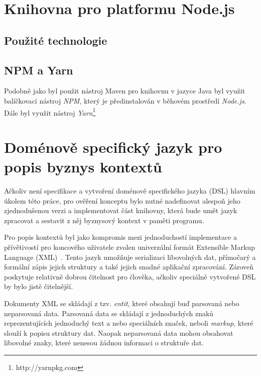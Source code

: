 \subsection{}

\section{Knihovna pro platformu Node.js}


\subsection{Použité technologie}

\subsection{NPM a Yarn}

Podobně jako byl použit nástroj Maven pro knihovnu v jazyce Java byl
využit balíčkovací nástroj \textit{NPM}, který je předinstalován
v běhovém prostředí \textit{Node.js}. Dále byl využit nástroj
\textit{Yarn}\footnote{http://yarnpkg.com} %

\section{Doménově specifický jazyk pro popis byznys kontextů}

Ačkoliv není specifikace a vytvoření doménově specifického jazyka (DSL)
hlavním úkolem této práce, pro ověření konceptu bylo nutné nadefinovat
alespoň jeho zjednodušenou verzi a implementovat část knihovny, která
bude umět jazyk zpracovat a sestavit z něj byznysový kontext v paměti programu.

Pro popis kontextů byl jako kompromis mezi jednoduchostí implementace
a přívětivostí pro koncového uživatele zvolen univerzální formát Extensible
Markup Language (XML)~\cite{bray1997extensible}. Tento
jazyk umožňuje serializaci libovolných dat, přímočarý a formální
zápis jejich struktury a také jejich snadné aplikační zpracování.
Zároveň poskytuje relativně dobrou čitelnost pro člověka, ačkoliv
speciálně vytvořené DSL by bylo jistě čitelnější.

Dokumenty XML se skládají z tzv. \textit{entit}, které obsahují
buď parsovaná nebo neparsovaná data. Parsovaná data se skládají
z jednoduchých znaků reprezentujících jednoduchý text a nebo
speciálních značek, neboli \textit{markup}, které slouží k popisu
struktury dat. Naopak neparsovaná data mohou obsahovat libovolné
znaky, které nenesou žádnou informaci o struktuře dat.

